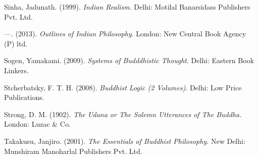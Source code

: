 \begin{thebibliography}{99}
  Sinha, Jadunath. (1999). \textit{Indian Realism}. Delhi: Motilal Banarsidass Publishers Pvt. Ltd.

  —. (2013). \textit{Outlines of Indian Philosophy}. London: New Central Book Agency (P) ltd.

  Sogen, Yamakami. (2009). \textit{Systems of Budddhistic Thought}. Delhi: Eastern Book Linkers.

  Stcherbatsky, F. T. H. (2008). \textit{Buddhist Logic (2 Volumes)}. Delhi: Low Price Publications.

  Strong, D. M. (1902). \textit{The Udana or The Solemn Utterances of The Buddha.} London: Luzac \& Co.

  Takakusu, Janjiro. (2001). \textit{The Essentials of Buddhist Philosophy.} New Delhi: Munshiram Manoharlal Publishers Pvt. Ltd.
 
 \end{thebibliography}

